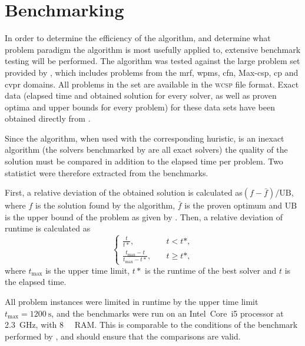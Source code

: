 \section{Benchmarking}
In order to determine the efficiency of the algorithm, and determine what problem paradigm the algorithm is most usefully applied to, extensive benchmark testing will be performed.
The algorithm was tested against the large problem set provided by \textcite{deGivry14}, which includes problems from the \gls{mrf}, \gls{wpms}, \gls{cfn}, Max-\gls{csp}, \gls{cp} and \gls{cvpr} domains.
All problems in the set are available in the \textsc{wcsp} file format.
Exact data (elapsed time and obtained solution for every solver, as well as proven optima and upper bounds for every problem) for these data sets have been obtained directly from \citeauthor{deGivry14}.

Since the algorithm, when used with the corresponding huristic, is an inexact algorithm (the solvers benchmarked by \textcite{deGivry14} are all exact solvers) the quality of the solution must be compared in addition to the elapsed time per problem.
Two statistict were therefore extracted from the benchmarks.

\label{pg:bench-method}
First, a relative deviation of the obtained solution is calculated as\(\left(f - \bar{f}\right)/\mathrm{UB}\), where \(f\) is the solution found by the algorithm, \(\bar{f}\) is the proven optimum and \(\mathrm{UB}\) is the upper bound of the problem as given by \textcite[\pno~??]{deGivry14}.
Then, a relative deviation of runtime is calculated as
\begin{equation*}
	\begin{cases}
		\frac{t}{t*}, &\quad t < t*, \\
		\frac{t_{\text{max}} - t}{t_{\text{max}} - t*}, &\quad t \geq t*,
	\end{cases}
\end{equation*}
where \(t_{\text{max}}\) is the upper time limit, \(t*\) is the runtime of the best solver \parencite[of those tested by][]{deGivry14} and \(t\) is the elapsed time.

All problem instances were limited in runtime by the upper time limit \(t_{\text{max}} = \SI{1200}{\second}\), and the benchmarks were run on an Intel~Core~i5 processor at \SI{2.3}{\giga\hertz}, with \SI{8}{\gibi\byte} RAM.
This is comparable to the conditions of the benchmark performed by \textcite{deGivry14}, and should ensure that the comparisons are valid.
